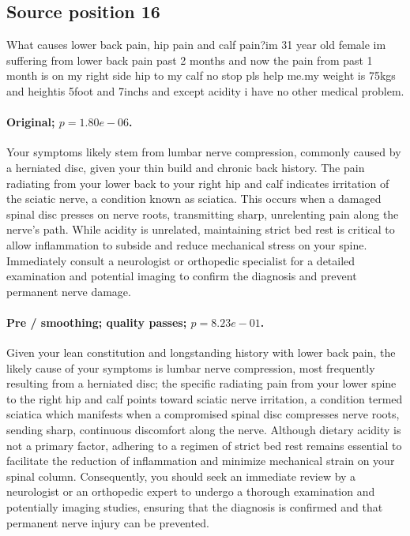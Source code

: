 \subsection*{Source position 16}
What causes lower back pain, hip pain and calf pain?im 31 year old female im suffering from lower back pain past 2 months and now the pain from past 1 month is on my right side hip to my calf no stop pls help me.my weight is 75kgs and heightis 5foot and 7inchs and except acidity i have no other medical problem.

\paragraph{Original; $p=1.80e-06$.} Your symptoms likely stem from lumbar nerve compression, commonly caused by a herniated disc, given your thin build and chronic back history. The pain radiating from your lower back to your right hip and calf indicates irritation of the sciatic nerve, a condition known as sciatica. This occurs when a damaged spinal disc presses on nerve roots, transmitting sharp, unrelenting pain along the nerve's path. While acidity is unrelated, maintaining strict bed rest is critical to allow inflammation to subside and reduce mechanical stress on your spine. Immediately consult a neurologist or orthopedic specialist for a detailed examination and potential imaging to confirm the diagnosis and prevent permanent nerve damage.


\paragraph{Pre / smoothing; quality passes; $p=8.23e-01$.} Given your lean constitution and longstanding history with lower back pain, the likely cause of your symptoms is lumbar nerve compression, most frequently resulting from a herniated disc; the specific radiating pain from your lower spine to the right hip and calf points toward sciatic nerve irritation, a condition termed sciatica which manifests when a compromised spinal disc compresses nerve roots, sending sharp, continuous discomfort along the nerve. Although dietary acidity is not a primary factor, adhering to a regimen of strict bed rest remains essential to facilitate the reduction of inflammation and minimize mechanical strain on your spinal column. Consequently, you should seek an immediate review by a neurologist or an orthopedic expert to undergo a thorough examination and potentially imaging studies, ensuring that the diagnosis is confirmed and that permanent nerve injury can be prevented.

